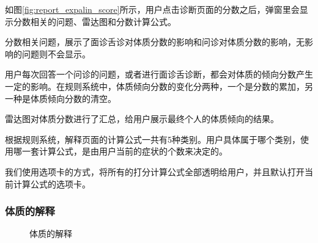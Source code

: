 如图\ref{fig:report_expalin_score}所示，用户点击诊断页面的分数之后，弹窗里会显示分数相关的问题、雷达图和分数计算公式。

分数相关问题，展示了面诊舌诊对体质分数的影响和问诊对体质分数的影响，无影响的问题则不会显示。

用户每次回答一个问诊的问题，或者进行面诊舌诊断，都会对体质的倾向分数产生一定的影响。在规则系统中，体质倾向分数的变化分两种，一个是分数的累加，另一种是体质倾向分数的清空。

雷达图对体质分数进行了汇总，给用户展示最终个人的体质倾向的结果。

根据规则系统，解释页面的计算公式一共有5种类别。用户具体属于哪个类别，使用哪一套计算公式，是由用户当前的症状的个数来决定的。

我们使用选项卡的方式，将所有的打分计算公式全部透明给用户，并且默认打开当前计算公式的选项卡。

\subsubsection{体质的解释}

\begin{figure}[ht]
    \centering
    \caption{体质的解释}
    \label{fig:report_explain_phy_1}
\end{figure}

